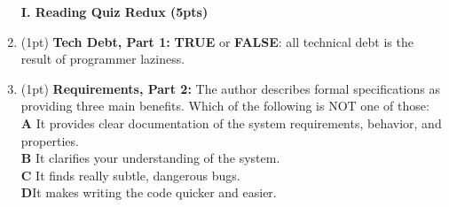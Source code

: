 \documentclass{report}
\newif\ifkey
\newcommand{\correct}[1]{\ifkey\color{red}\textbf{#1}\color{black}\else\textbf{#1}\fi\xspace}
\newcommand{\answershort}[1]{\ifkey\color{red}\underline{\textbf{#1}}\color{black}\else\underline{\hspace{3in}}\fi\xspace}
\newcommand*{\pts}[1]{\addtocounter{points}{#1}(#1pt)}
\begin{document}
\begin{spacing}{1.4}
\begin{enumerate}[leftmargin=*]
\newpage

\textbf{I. Reading Quiz Redux (5pts)}




\item \pts{1}
  \textbf{Tech Debt, Part 1:} \textbf{TRUE} or \correct{FALSE}:
  all technical debt is the result of programmer laziness.


\item \pts{1}
  \textbf{Requirements, Part 2:}
  The author describes formal specifications as providing three main benefits. Which of the following is NOT one of those:
  \\ \textbf{A}\hspace{0.2in} It provides clear documentation of the system requirements, behavior, and properties.
  \\ \textbf{B}\hspace{0.2in} It clarifies your understanding of the system.
  \\ \textbf{C}\hspace{0.2in} It finds really subtle, dangerous bugs.
  \\ \correct{D}\hspace{0.2in}It makes writing the code quicker and easier.


\end{enumerate}
\end{spacing}
\end{document}
